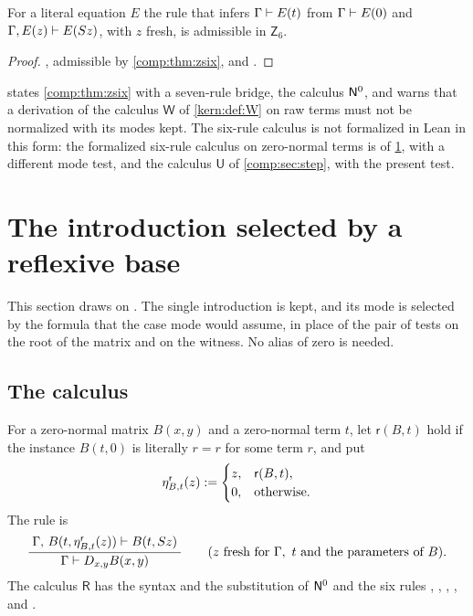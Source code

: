 \begin{corollary}
\label{comp:cor:zsixind}
For a literal equation $E$ the rule that infers $\Gamma\vdash E(t)$ from
$\Gamma\vdash E(0)$ and $\Gamma,E(z)\vdash E(S z)$, with $z$ fresh, is
admissible in $\mathsf{Z}_6$.
\end{corollary}

\begin{proof}
, admissible by \cref{comp:thm:zsix}, and .
\end{proof}

\begin{remark}
 states \cref{comp:thm:zsix} with a seven-rule bridge, the
calculus $\mathsf{N}^{0}$, and warns that a derivation of the calculus
$\mathsf{W}$ of \cref{kern:def:W} on raw terms must not be normalized with
its modes kept. The six-rule calculus
is not formalized in Lean in this form: the formalized six-rule calculus on
zero-normal terms is  of \cref{comp:sec:reflexive}, with a
different mode test, and the calculus $\mathsf{U}$ of \cref{comp:sec:step},
with the present test.
\end{remark}

\section{The introduction selected by a reflexive base}
\label{comp:sec:reflexive}

This section draws on . The single introduction is
kept, and its mode is selected by the formula that the case mode would
assume, in place of the pair of tests on the root of the matrix and on the
witness. No alias of zero is needed.

\subsection{The calculus}

\begin{definition}
\label{comp:def:reflexive}
For a zero-normal matrix $B(x,y)$ and a zero-normal term $t$, let
$\mathsf{r}(B,t)$ hold if the instance $B(t,0)$ is literally $r=r$ for some
term $r$, and put
\[
 \eta^{\mathsf r}_{B,t}(z)\mathrel{:=}
 \begin{cases}
  z, & \mathsf{r}(B,t),\\
  0, & \text{otherwise}.
 \end{cases}
\]
The rule  is
\[
 \dfrac{\;\Gamma,\,B(t,\eta^{\mathsf r}_{B,t}(z))\vdash B(t,S z)\;}{\;\Gamma\vdash D_{x,y}B(x,y)\;}
 \qquad(z\text{ fresh for }\Gamma,\ t\text{ and the parameters of }B).
\]
The calculus $\mathsf{R}$ has the syntax and the substitution of $\mathsf{N}^{0}$
and the six rules , , ,
,  and .
\end{definition}

